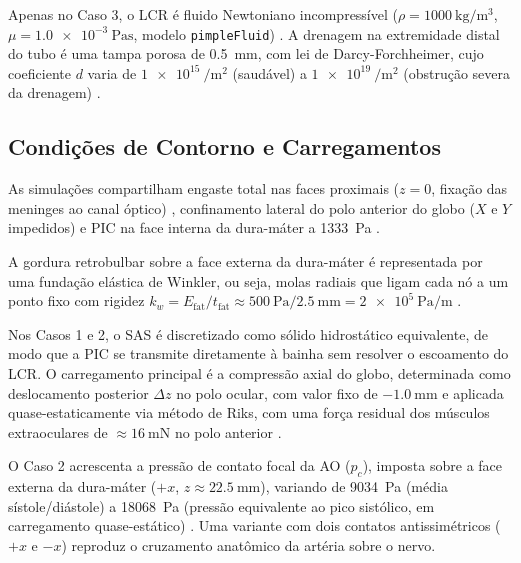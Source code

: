 \documentclass[article, hidelinks,oneside,12pt]{abntex2}
\begin{document}
Apenas no Caso 3, o LCR é fluido Newtoniano incompressível ($\rho = \SI{1000}{\kilogram\per\meter\cubed}$, $\mu = \SI{1.0e-3}{\pascal\second}$, modelo \texttt{pimpleFluid}) \cite{gholampour2018, namaghi2026}. A drenagem na extremidade distal do tubo é uma tampa porosa de \SI{0.5}{\milli\meter}, com lei de Darcy-Forchheimer, cujo coeficiente $d$ varia de $\SI{1e15}{\per\meter\squared}$ (saudável) a $\SI{1e19}{\per\meter\squared}$ (obstrução severa da drenagem) \cite{namaghi2026}.



\subsection*{Condições de Contorno e Carregamentos}
\label{sec:met-contorno}

As simulações compartilham engaste total nas faces proximais ($z = 0$, fixação das meninges ao canal óptico) \cite{wang2016}, confinamento lateral do polo anterior do globo ($X$ e $Y$ impedidos) e PIC na face interna da dura-máter a \SI{1333}{\pascal} \cite{feola2016, wang2016, namaghi2026}. 

A gordura retrobulbar sobre a face externa da dura-máter é representada por uma fundação elástica de Winkler, ou seja, molas radiais que ligam cada nó a um ponto fixo com rigidez $k_w = E_{\mathrm{fat}}/t_{\mathrm{fat}} \approx \SI{500}{\pascal}/\SI{2.5}{\milli\meter} = \SI{2e5}{\pascal\per\meter}$ \cite{schoemaker2006, yoo2011}. 

Nos Casos 1 e 2, o SAS é discretizado como sólido hidrostático equivalente, de modo que a PIC se transmite diretamente à bainha sem resolver o escoamento do LCR. O carregamento principal é a compressão axial do globo, determinada como deslocamento posterior $\Delta z$ no polo ocular, com valor fixo de $-\SI{1.0}{\milli\meter}$ \cite{reilly2023} e aplicada quase-estaticamente via método de Riks, com uma força residual dos músculos extraoculares de $\approx \SI{16}{\milli\newton}$ no polo anterior \cite{reilly2023}.

O Caso 2 acrescenta a pressão de contato focal da AO ($p_c$), imposta sobre a face externa da dura-máter ($+x$, $z \approx \SI{22.5}{\milli\meter}$), variando de \SI{9034}{\pascal} (média sístole/diástole) a \SI{18068}{\pascal} (pressão equivalente ao pico sistólico, em carregamento quase-estático) \cite{feola2016}. Uma variante com dois contatos antissimétricos ($+x$ e $-x$) reproduz o cruzamento anatômico da artéria sobre o nervo.
\end{document}
